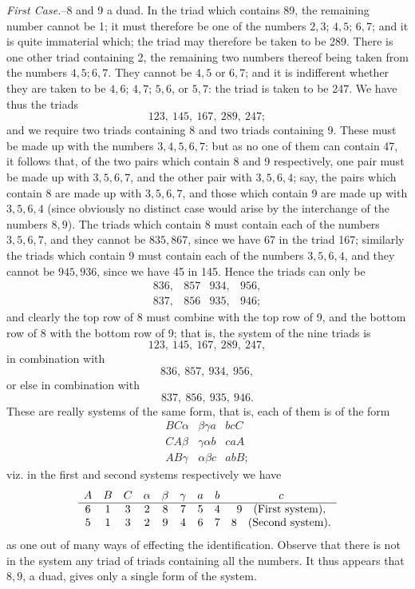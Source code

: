 \documentclass[10pt]{article}
\begin{document}
\emph{First Case.}--8 and 9 a duad. In the triad which contains 89, the
remaining number cannot be 1; it must therefore be one of the numbers $2,3$;
$4,5$; $6,7$; and it is quite immaterial which; the triad may therefore be
taken to be 289. There is one other triad containing 2, the remaining two
numbers thereof being taken from the numbers $4,5;6,7$. They cannot be $4,5$
or $6,7$; and it is indifferent whether they are taken to be $4,6$; $4,7$;
$5,6$, or $5,7$: the triad is taken to be 247. We have thus the triads
\[
        123,\ 145,\ 167,\ 289,\ 247;
\]
and we require two triads containing 8 and two triads containing 9. These must
be made up with the numbers $3,4,5,6,7$: but as no one of them can contain 47,
it follows that, of the two pairs which contain 8 and 9 respectively, one pair
must be made up with $3,5,6,7$, and the other pair with $3,5,6,4$; say, the
pairs which contain 8 are made up with $3,5,6,7$, and those which contain 9
are made up with $3,5,6,4$ (since obviously no distinct case would arise by
the interchange of the numbers $8,9$). The triads which contain 8 must contain
each of the numbers $3,5,6,7$, and they cannot be $835,867$, since we have 67
in the triad 167; similarly the triads which contain 9 must contain each of
the numbers $3,5,6,4$, and they cannot be $945,936$, since we have 45 in 145.
Hence the triads can only be
\[
\begin{array}{cc|cc}
836,&857&934,&956,\\
837,&856&935,&946;
\end{array}
\]
and clearly the top row of 8 must combine with the top row of 9, and the bottom
row of 8 with the bottom row of 9; that is, the system of the nine triads is
\[
123,\ 145,\ 167,\ 289,\ 247,
\]
in combination with
\[
836,\ 857,\ 934,\ 956,
\]
or else in combination with
\[
837,\ 856,\ 935,\ 946.
\]
These are really systems of the same form, that is, each of them is of the form
\[
\begin{array}{c|c|c}
BC\alpha & \beta\gamma a & bcC\\
CA\beta  & \gamma\alpha b & caA\\
AB\gamma & \alpha\beta c & abB;
\end{array}
\]
viz. in the first and second systems respectively we have
\[
\begin{array}{ccccccccc}
A&B&C&\alpha&\beta&\gamma&a&b&c\\ \hline
6&1&3&2&8&7&5&4&9 \quad\hbox{(First system)},\\
5&1&3&2&9&4&6&7&8 \quad\hbox{(Second system)}.
\end{array}
\]
as one out of many ways of effecting the identification. Observe that there is
not in the system any triad of triads containing all the numbers. It thus
appears that $8,9$, a duad, gives only a single form of the system.
\end{document}
